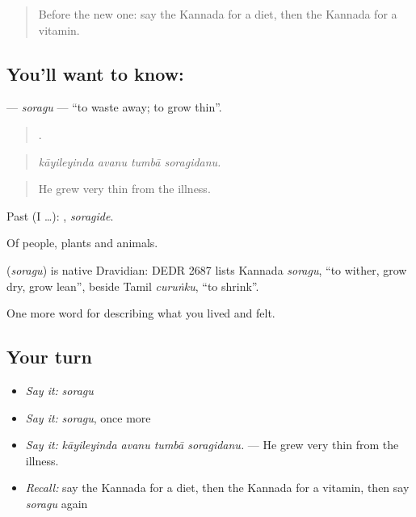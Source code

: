 \label{lesson:KA-C514-soragu}



\begin{quote}
Before the new one: say the Kannada for a diet, then the Kannada for a vitamin.
\end{quote}

\subsection*{You'll want to know: }
\textbf{} — \emph{soragu} — \textquotedblleft{}to waste away; to grow thin\textquotedblright{}.

\begin{quote}
   .
\end{quote}

\begin{quote}
\emph{kāyileyinda avanu tumbā soragidanu.}
\end{quote}

\begin{quote}
He grew very thin from the illness.
\end{quote}

Past (I …): , \emph{soragide}.

Of people, plants and animals.

\begin{cousinweb}
\textbf{} (\emph{soragu}) is native Dravidian: DEDR 2687 lists Kannada \emph{soragu}, \textquotedblleft{}to wither, grow dry, grow lean\textquotedblright{}, beside Tamil \emph{curuṅku}, \textquotedblleft{}to shrink\textquotedblright{}.
\end{cousinweb}

\begin{grammarlens}[title={What you've built}]
One more word for describing what you lived and felt.
\end{grammarlens}

\subsection*{Your turn}
\begin{itemize}
\raggedright
  \item \emph{Say it:} \emph{soragu}
  \item \emph{Say it:} \emph{soragu}, once more
  \item \emph{Say it:} \emph{kāyileyinda avanu tumbā soragidanu.} — He grew very thin from the illness.
  \item \emph{Recall:} say the Kannada for a diet, then the Kannada for a vitamin, then say \emph{soragu} again
\end{itemize}

